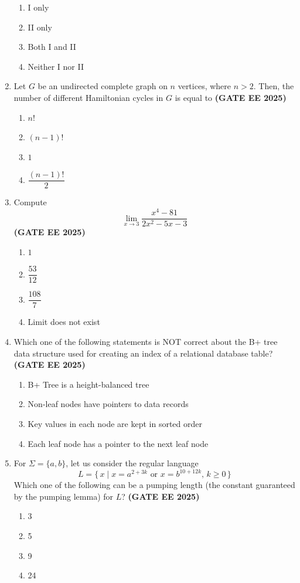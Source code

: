 \documentclass[journal,12pt,onecolumn]{IEEEtran}
\theoremstyle{remark}
\begin{document}
\begin{enumerate}
\begin{enumerate}
    \item  I only
    \item  II only
    \item  Both I and II
    \item  Neither I nor II
\end{enumerate}

 

\item  Let $G$ be an undirected complete graph on $n$ vertices, where $n > 2$. Then, the number of different Hamiltonian cycles in $G$ is equal to  \hfill \textbf{(GATE EE 2025)}
\begin{enumerate}
    \item  $n!$
    \item  $(n-1)!$
    \item  $1$
    \item  $\dfrac{(n-1)!}{2}$
\end{enumerate}

 

\item Compute  
\[
\lim_{x \to 3} \frac{x^4 - 81}{2x^2 - 5x - 3}
\] \hfill \textbf{(GATE EE 2025)}
\begin{enumerate}
    \item  $1$
    \item  $\dfrac{53}{12}$
    \item  $\dfrac{108}{7}$
    \item  Limit does not exist
\end{enumerate}

 

\item  Which one of the following statements is NOT correct about the B+ tree data structure used for creating an index of a relational database table?\hfill \textbf{(GATE EE 2025)}  
\begin{enumerate}
    \item  B+ Tree is a height-balanced tree
    \item  Non-leaf nodes have pointers to data records
    \item  Key values in each node are kept in sorted order
    \item  Each leaf node has a pointer to the next leaf node
\end{enumerate}

 

\item  For $\Sigma = \{a,b\}$, let us consider the regular language 
\[
L = \{ \, x \mid x = a^{2+3k} \text{ or } x = b^{10+12k}, \, k \geq 0 \, \}
\]
Which one of the following can be a pumping length (the constant guaranteed by the pumping lemma) for $L$? \hfill \textbf{(GATE EE 2025)} 
\begin{enumerate}
    \item  3
    \item  5
    \item  9
    \item  24
\end{enumerate}



\end{enumerate}
\end{document}
